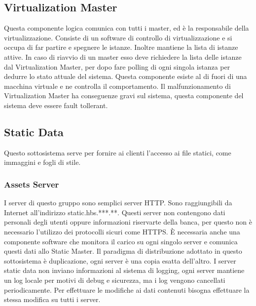 \subsection{Virtualization Master}
Questa componente logica comunica con tutti i master, ed \`e la responsabile della virtualizzazione.
Consiste di un software di controllo di virtualizzazione e si occupa di far partire e spegnere le istanze.
Inoltre mantiene la lista di istanze attive.
In caso di riavvio di un master esso deve richiedere la lista delle istanze dal Virtualization Master, per dopo fare polling di ogni singola istanza per dedurre lo stato attuale del sistema.
Questa componente esiste al di fuori di una macchina virtuale e ne controlla il comportamento.
Il malfunzionamento di Virtualization Master ha conseguenze gravi sul sistema, questa componente del sistema deve essere fault tollerant.
\subsection{Static Data}

Questo sottosistema serve per fornire ai clienti l'accesso ai file statici, come immaggini e fogli di stile.

\subsubsection{Assets Server}
I server di questo gruppo sono semplici server HTTP. Sono raggiungibili da Internet all'indirizzo static.hbs.***.**. Questi server non contengono dati personali degli utenti oppure informazioni riservarte della banca, per questo non \`e necessario l'utilizzo dei protocolli sicuri come HTTPS.
\`E necessaria anche una componente software che monitora il carico su ogni singolo server e comunica questi dati allo Static Master.
Il paradigma di distribuzione adottato in questo sottosistema \`e duplicazione, ogni server \`e una copia esatta dell'altro.
I server static data non inviano informazioni al sistema di logging, ogni server mantiene un log locale per motivi di debug e sicurezza, ma i log vengono cancellati periodicamente.
Per effettuare le modifiche ai dati contenuti bisogna effettuare la stessa modifica su tutti i server.

